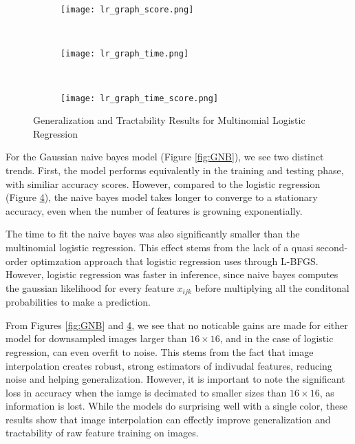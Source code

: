 \documentclass{article}
\begin{document}
\begin{figure}
  \centering
  \begin{subfigure}[b]{0.3\textwidth}
    \centering
    \texttt{[image: lr\_graph\_score.png]}
    \caption*{}
    \label{fig:lr_graph_score}
  \end{subfigure}
  ~
  \begin{subfigure}[b]{0.3\textwidth}
    \centering
    \texttt{[image: lr\_graph\_time.png]}
    \caption*{}
    \label{fig:lr_graph_time}
  \end{subfigure}
  ~
  \begin{subfigure}[b]{0.3\textwidth}
    \centering
    \texttt{[image: lr\_graph\_time\_score.png]}
    \caption*{}
    \label{fig:lr_graph_time_score}
  \end{subfigure}
  \vspace{-10pt}
  \caption{Generalization and Tractability Results for Multinomial Logistic Regression}
  \label{fig:MLR}
\end{figure}

For the Gaussian naive bayes model (Figure \ref{fig:GNB}), we see two distinct trends.
First, the model performs equivalently in the training and testing phase, with
similiar accuracy scores. However, compared to the logistic regression
(Figure \ref{fig:MLR}), the naive bayes model takes longer to converge to a
stationary accuracy, even when the number of features is growning exponentially.

The time to fit the naive bayes was also significantly smaller than the multinomial
logistic regression. This effect stems from the lack of a quasi second-order
optimzation approach that logistic regression uses through L-BFGS. However,
logistic regression was faster in inference, since naive bayes computes
the gaussian likelihood for every feature $x_{ijk}$ before multiplying all
the conditonal probabilities to make a prediction.

From Figures \ref{fig:GNB} and \ref{fig:MLR}, we see that no noticable gains
are made for either model for downsampled images larger than $16 \times 16$,
and in the case of logistic regression, can even overfit to noise. This stems
from the fact that image interpolation creates robust, strong estimators of
indivudal features, reducing noise and helping generalization. However,
it is important to note the significant loss in accuracy when the iamge is
decimated to smaller sizes than $16 \times 16$, as information is lost. While
the models do surprising well with a single color, these results show that
image interpolation can effectly improve generalization and tractability of
raw feature training on images.
\end{document}
